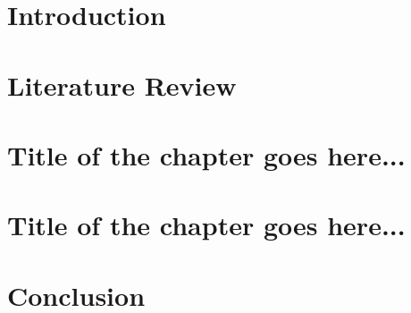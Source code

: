 \documentclass[11pt]{book}
\begin{document}
\mastersthesis

\chapter{Introduction}
\label{ch:intro}
% 
\chapter{Literature Review}
\label{ch:lit_review}
% 

\chapter{Title of the chapter goes here...}
\label{ch:ch1}


\chapter{Title of the chapter goes here...}
\label{ch:ch2}
% 

\chapter{Conclusion}
\label{ch:conc}
% 


\printbibliography %
\end{document}
